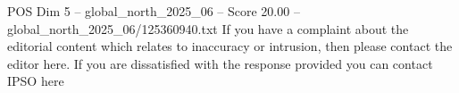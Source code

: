 \begin{textsample}{POS Dim 5 – global\_north\_2025\_06 – Score 20.00 – global\_north\_2025\_06/125360940.txt}
If you have a complaint about the editorial content which relates to inaccuracy or intrusion, then please contact the editor here.
If you are dissatisfied with the response provided you can contact IPSO here

\end{textsample}
